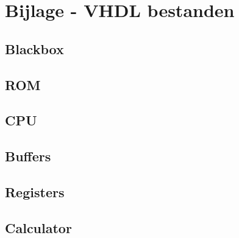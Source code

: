 \documentclass[oneside,dutch]{tudelft-report}
\begin{document}
\chapter{Bijlage - VHDL bestanden}
\section{Blackbox}
\label{Blackbox entity}
 
\label{Blackbox behaviour}

\label{Stream entity}

\label{Stream behaviour}


\section{ROM}
\label{ROM}


\section{CPU}
\label{}

\label{}

\label{}

\label{}





\section{Buffers}














\section{Registers}














\section{Calculator}


\end{document}
